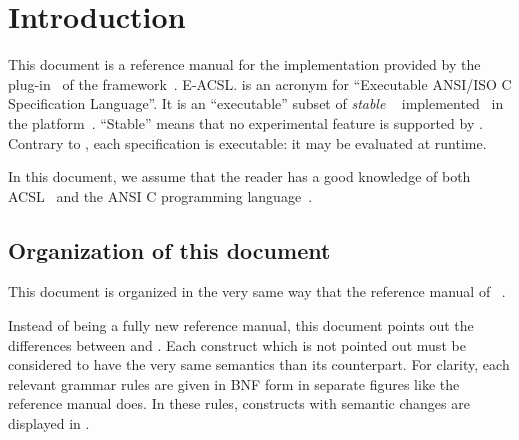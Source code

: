 \chapter{Introduction}

This document is a reference manual for
%
{the \eacsl implementation provided by the \eacsl plug-in~\cite{eacsl-plugin} of
  the \framac framework~\cite{framac}.}%
{E-ACSL.}
\eacsl is an acronym for ``Executable ANSI/ISO C
Specification Language''. It is an ``executable'' subset of
\emph{stable} \acsl~\cite{acsl} implemented~\cite{acslimplem} in the \framac
platform~\cite{framac}. ``Stable'' means that no experimental \acsl feature is
supported by \eacsl. Contrary to \acsl, each \eacsl specification is
executable: it may be evaluated at runtime.

In this document, we assume that the reader has a good knowledge of both
ACSL~\cite{acsl} and the ANSI C programming language~\cite{standardc99,KR88}.

\section{Organization of this document}

This document is organized in the very same way that the reference manual of
\acsl~\cite{acsl}.

Instead of being a fully new reference manual, this document points out the
differences between \eacsl and \acsl. Each \eacsl construct which is not pointed
out must be considered to have the very same semantics than its \acsl
counterpart. For clarity, each relevant grammar rules are given in BNF form
in separate figures like the \acsl reference manual does. In these rules,
constructs with semantic changes are displayed in .

